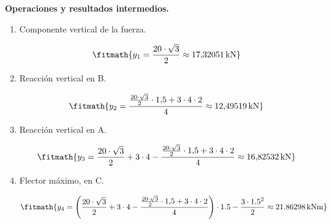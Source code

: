 \noindent\textbf{Operaciones y resultados intermedios.}

\begin{enumerate}

\item Componente vertical de la fuerza.

\[\fitmath{y_{1}=\frac{20\cdot \sqrt{3}}{2}\approx 17{,}32051\,\mathrm{kN}}\]

\item Reacción vertical en B.

\[\fitmath{y_{2}=\frac{\frac{20\cdot \sqrt{3}}{2}\cdot 1{,}5+3\cdot 4\cdot 2}{4}\approx 12{,}49519\,\mathrm{kN}}\]

\item Reacción vertical en A.

\[\fitmath{y_{3}=\frac{20\cdot \sqrt{3}}{2}+3\cdot 4-\frac{\frac{20\cdot \sqrt{3}}{2}\cdot 1{,}5+3\cdot 4\cdot 2}{4}\approx 16{,}82532\,\mathrm{kN}}\]

\item Flector máximo, en C.

\[\fitmath{y_{4}=\left(\frac{20\cdot \sqrt{3}}{2}+3\cdot 4-\frac{\frac{20\cdot \sqrt{3}}{2}\cdot 1{,}5+3\cdot 4\cdot 2}{4}\right)\cdot 1.5-\frac{3\cdot {1.5}^{2}}{2}\approx 21{,}86298\,\mathrm{kN m}}\]

\end{enumerate}
